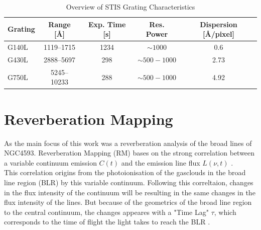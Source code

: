 \begin{table}[h!]
	\centering
	\small
	\caption{Overview of STIS Grating Characteristics \parencite{stisgratings}}
	\label{tab:stis_gratings}
	\begin{tabular}{lcccc}
		\hline
		\textbf{Grating} & \textbf{Range [\AA]} & \textbf{Exp. Time [s]} & \textbf{Res. Power} & \textbf{Dispersion [\AA/pixel]} \\
		\hline
		G140L  & 1119--1715  & 1234 & $\sim 1000$         & 0.6 \\
		G430L  & 2888--5697  & 298  & $\sim 500 - 1000$    & 2.73 \\
		G750L  & 5245--10233 & 288  & $\sim 500 - 1000$    & 4.92 \\
		\hline
	\end{tabular}
\end{table}

\section{Reverberation Mapping}

As the main focus of this work was a reverberation analysis of the broad lines of NGC4593. Reverberation Mapping (RM) bases on the strong correlation between a variable continuum emission $C\left(t\right)$ and the emission line flux $L\left(\nu,t\right)$ \parencite{horne2021space}. \\
This correlation origins from the photoionisation of the gasclouds in the broad line region (BLR) by this variable continuum. Following this correltaion, changes in the flux intensity of the continuum will be resulting in the same changes in the flux intensity of the lines. But because of the geometrics of the broad line region to the central continuum, the changes appeares with a "Time Lag" $\tau$, which corresponds to the time of flight the light takes to reach the BLR \parencite{peterson1997introduction}.